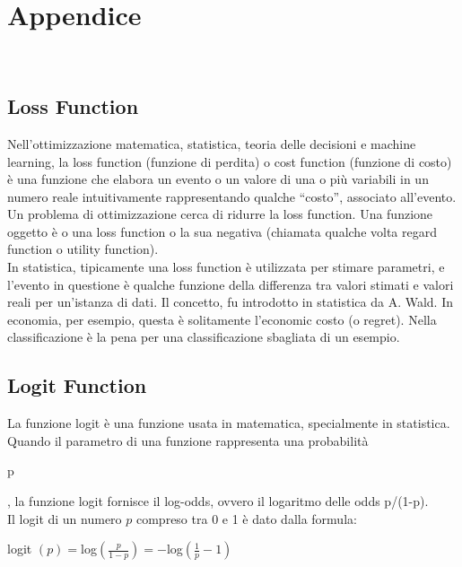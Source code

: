 \chapter{Appendice}
\ \
\newline
\section{Loss Function}
Nell'ottimizzazione matematica, statistica, teoria delle decisioni e machine learning, la loss function 
(funzione di perdita) o cost function (funzione di costo) \`e una funzione che elabora un evento o un valore 
di una o pi\`u variabili in un numero reale intuitivamente rappresentando qualche ``costo'', associato all'evento. 
Un problema di ottimizzazione cerca di ridurre la loss function. Una funzione oggetto \`e o una loss 
function o la sua negativa (chiamata qualche volta regard function o utility function).\\
\newline
In statistica, tipicamente una loss function \`e utilizzata per stimare parametri, e l'evento in questione \`e 
qualche funzione della differenza tra valori stimati e valori reali per un'istanza di dati. 
Il concetto, fu introdotto in statistica da A. Wald. In economia, per esempio, questa \`e solitamente 
l'economic costo (o regret). Nella classificazione \`e la pena per una classificazione sbagliata di un esempio. 
\section{Logit Function}
La funzione logit \`e una funzione usata in matematica, specialmente in statistica. Quando il parametro di una 
funzione rappresenta una probabilit\`a \begin{it}
                                        p
                                       \end{it}, la funzione logit fornisce il log-odds, ovvero il logaritmo 
delle odds p/(1-p). \\
Il logit di un numero \begin{math}
                       p
                      \end{math} compreso tra 0 e 1 \`e dato dalla formula:
\begin{center}logit
 \begin{math}
  (p) = 
 \end{math}log\begin{math}
               (\frac{p}{1-p}) = -  
              \end{math}log\begin{math}
                             (\frac{1}{p}-1)
                            \end{math}



\end{center}



